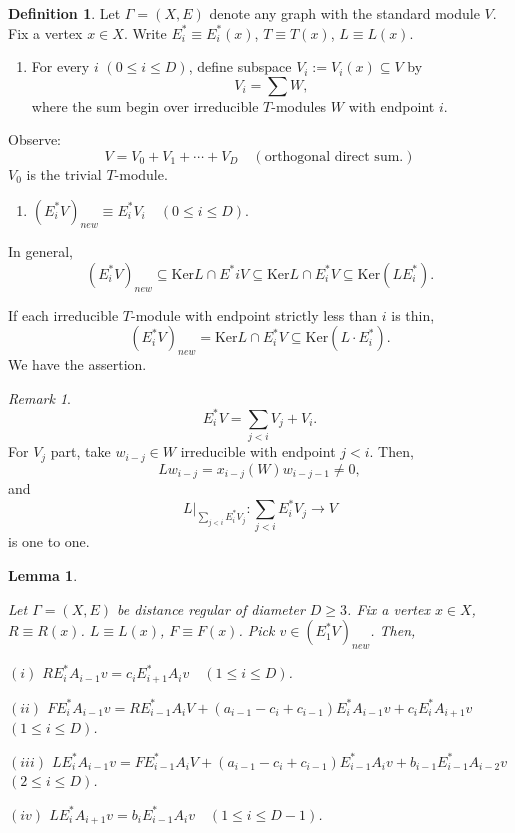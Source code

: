 \documentclass[
]{book}
\providecommand{\tightlist}{%
  \setlength{\itemsep}{0pt}\setlength{\parskip}{0pt}}
\newtheorem{lemma}{Lemma}[chapter]
\theoremstyle{definition}
\newtheorem{definition}{Definition}[chapter]
\theoremstyle{definition}
\theoremstyle{definition}
\theoremstyle{definition}
\theoremstyle{remark}
\newtheorem*{remark}{Remark}
\begin{document}
\begin{definition}
\protect\hypertarget{def:vix}{}\label{def:vix}Let \(\Gamma = (X, E)\) denote any graph with the standard module \(V\). Fix a vertex \(x\in X\). Write \(E^*_i \equiv E^*_i(x)\), \(T \equiv T(x)\), \(L\equiv L(x)\).

\begin{enumerate}
\def\labelenumi{\arabic{enumi}.}
\tightlist
\item
  For every \(i\) \((0\leq i\leq D)\), define subspace \(V_i := V_i(x) \subseteq V\) by
  \[V_i = \sum W,\]
  where the sum begin over irreducible \(T\)-modules \(W\) with endpoint \(i\).
\end{enumerate}

Observe:
\[V = V_0 + V_1 + \cdots + V_D \quad (\text{orthogonal direct sum.})\]
\(V_0\) is the trivial \(T\)-module.

\begin{enumerate}
\def\labelenumi{\arabic{enumi}.}
\setcounter{enumi}{1}
\tightlist
\item
  \((E^*_iV)_{new} \equiv E^*_iV_i \quad (0\leq i\leq D).\)
\end{enumerate}

In general,
\[(E^*_iV)_{new} \subseteq \mathrm{Ker}L \cap E^*iV \subseteq \mathrm{Ker}L \cap E^*_iV \subseteq \mathrm{Ker}(LE^*_i).\]

If each irreducible \(T\)-module with endpoint strictly less than \(i\) is thin,
\[(E^*_iV)_{new} = \mathrm{Ker}L \cap E^*_iV \subseteq \mathrm{Ker}(L\cdot E^*_i).\]
We have the assertion.
\end{definition}

\begin{remark}
\[E^*_iV = \sum_{j<i} V_j + V_i.\]
For \(V_j\) part, take \(w_{i-j}\in W\) irreducible with endpoint \(j<i\). Then,
\[Lw_{i-j} = x_{i-j}(W)w_{i-j-1}\neq 0,\]
and
\[L|_{\sum_{j<i}E^*_iV_j}: \sum_{j<i}E^*_iV_j \to V\]
is one to one.
\end{remark}

\begin{lemma}
\protect\hypertarget{lem:action-on-estar1v-new}{}\label{lem:action-on-estar1v-new}

Let \(\Gamma = (X, E)\) be distance regular of diameter \(D\geq 3\). Fix a vertex \(x\in X\), \(R\equiv R(x)\). \(L\equiv L(x)\), \(F \equiv F(x)\). Pick \(v\in (E^*_1V)_{new}\). Then,

\((i)\) \(RE^*_iA_{i-1}v = c_iE^*_{i+1}A_iv\quad (1\leq i\leq D)\).

\((ii)\) \(FE^*_iA_{i-1}v = RE^*_{i-1}A_iV + (a_{i-1}-c_i+c_{i-1})E^*_iA_{i-1}v + c_{i}E^*_{i}A_{i+1}v\) \((1\leq i\leq D)\).

\((iii)\) \(LE^*_iA_{i-1}v = FE^*_{i-1}A_iV + (a_{i-1}-c_i+c_{i-1})E^*_{i-1}A_{i}v + b_{i-1}E^*_{i-1}A_{i-2}v\) \((2\leq i\leq D)\).

\((iv)\) \(LE^*_iA_{i+1}v = b_iE^*_{i-1}A_iv \quad (1\leq i\leq D-1)\).

\end{lemma}
\end{document}
